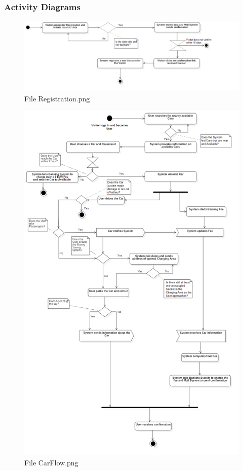 \subsubsection{Activity Diagrams}
\begin{figure}[!htbp]
\centering
\includegraphics[width=\linewidth,keepaspectratio]{../Diagrams/AD/Registration.png}
\caption{File Registration.png}
\end{figure}
\FloatBarrier
\begin{figure}[!htbp]
\centering
\includegraphics[width=\linewidth,keepaspectratio]{../Diagrams/AD/CarFlow.png}
\caption{File CarFlow.png}
\end{figure}
\FloatBarrier

